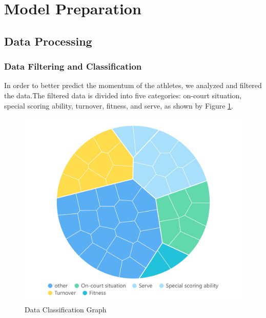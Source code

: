 \section{Model Preparation}
\subsection{Data Processing}
\subsubsection{Data Filtering and Classification}
In order to better predict the momentum of the athletes, we analyzed and filtered the data.The filtered data is divided into five categories: on-court situation, special scoring ability, turnover, fitness, and serve, as shown by Figure \ref{fig:WeightP1}.
\begin{figure}[bt!]
    \centering
    \includegraphics[width=0.5\linewidth]{figure/维诺图-副本.jpg}
    \caption{\centering Data Classification Graph}
    \label{fig:WeightP1}
\end{figure}
